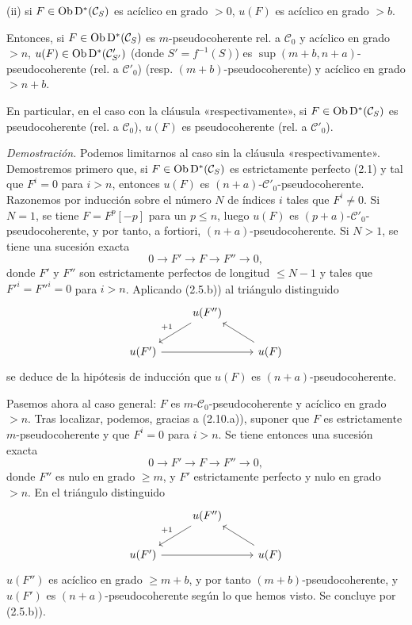 (ii) si \(F\in\operatorname{Ob}\mathrm D^*(\mathcal C_S)\) es acíclico en grado \(>0\), \(u(F)\) es acíclico en grado \(>b\).

Entonces, si \(F\in\operatorname{Ob}\mathrm D^*(\mathcal C_S)\) es \(m\)-pseudocoherente rel. a \(\mathcal C_0\) y acíclico en grado \(>n\), \(u(F)\in\operatorname{Ob}\mathrm D^*(\mathcal C'_{S'})\) (donde \(S'=f^{-1}(S)\)) es \(\sup(m+b,n+a)\)-pseudocoherente (rel. a \(\mathcal C'_0\)) (resp. \((m+b)\)-pseudocoherente) y acíclico en grado \(>n+b\).

En particular, en el caso con la cláusula «respectivamente», si \(F\in\operatorname{Ob}\mathrm D^*(\mathcal C_S)\) es pseudocoherente (rel. a \(\mathcal C_0\)), \(u(F)\) es pseudocoherente (rel. a \(\mathcal C'_0\)).

\emph{Demostración.} Podemos limitarnos al caso sin la cláusula «respectivamente». Demostremos primero que, si \(F\in\operatorname{Ob}\mathrm D^*(\mathcal C_S)\) es estrictamente perfecto (2.1) y tal que \(F^i=0\) para \(i>n\), entonces \(u(F)\) es \((n+a)\)-\(\mathcal C'_0\)-pseudocoherente. Razonemos por inducción sobre el número \(N\) de índices \(i\) tales que \(F^i\neq0\). Si \(N=1\), se tiene \(F=F^p[-p]\) para un \(p\leq n\), luego \(u(F)\) es \((p+a)\)-\(\mathcal C'_0\)-pseudocoherente, y por tanto, a fortiori, \((n+a)\)-pseudocoherente. Si \(N>1\), se tiene una sucesión exacta
\[
  0\longrightarrow F'\longrightarrow F\longrightarrow F''\longrightarrow 0,
\]
donde \(F'\) y \(F''\) son estrictamente perfectos de longitud \(\leq N-1\) y tales que \(F'^i=F''^i=0\) para \(i>n\). Aplicando (2.5.b)) al triángulo distinguido
\[
\begin{tikzcd}
& u(F'') \arrow[dl,"+1"'] & \\
u(F') \arrow[rr] && u(F) \arrow[ul]
\end{tikzcd}
\]
se deduce de la hipótesis de inducción que \(u(F)\) es \((n+a)\)-pseudocoherente.

Pasemos ahora al caso general: \(F\) es \(m\)-\(\mathcal C_0\)-pseudocoherente y acíclico en grado \(>n\). Tras localizar, podemos, gracias a (2.10.a)), suponer que \(F\) es estrictamente \(m\)-pseudocoherente y que \(F^i=0\) para \(i>n\). Se tiene entonces una sucesión exacta
\[
  0\longrightarrow F'\longrightarrow F\longrightarrow F''\longrightarrow 0,
\]
donde \(F''\) es nulo en grado \(\geq m\), y \(F'\) estrictamente perfecto y nulo en grado \(>n\). En el triángulo distinguido
\[
\begin{tikzcd}
& u(F'') \arrow[dl,"+1"'] & \\
u(F') \arrow[rr] && u(F) \arrow[ul]
\end{tikzcd}
\]
\(u(F'')\) es acíclico en grado \(\geq m+b\), y por tanto \((m+b)\)-pseudocoherente, y \(u(F')\) es \((n+a)\)-pseudocoherente según lo que hemos visto. Se concluye por (2.5.b)).

